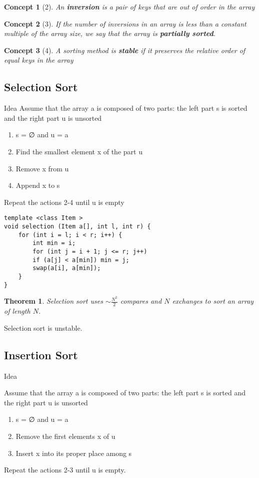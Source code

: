 \documentclass{article}
\newtheorem*{theorem}{Theorem}
\newtheorem*{concept}{Concept}
\begin{document}
\begin{concept}[2]
    An \textbf{inversion} is a pair of keys that are out of order in the array
\end{concept}

\begin{concept}[3]
    If the number of inversions in an array is less than a constant multiple of the array size, we say that the array is \textbf{partially sorted}.
\end{concept}
\begin{concept}[4]
    A sorting method is \textbf{stable} if it preserves the relative order of equal keys in the array
\end{concept}

\subsection{Selection Sort}

Idea
Assume that the array a is composed of two parts: the left part s is sorted and
the right part u is unsorted
\begin{enumerate}
    \item s = ∅ and u = a
    \item Find the smallest element x of the part u
    \item Remove x from u
    \item Append x to s
\end{enumerate}
Repeat the actions 2-4 until u is empty

\begin{verbatim}
template <class Item >
void selection (Item a[], int l, int r) {
    for (int i = l; i < r; i++) {
        int min = i;
        for (int j = i + 1; j <= r; j++)
        if (a[j] < a[min]) min = j;
        swap(a[i], a[min]);
    }
}
\end{verbatim}

\begin{theorem}
 Selection sort uses $\sim \frac{N^2}{2}$ compares and $N$ exchanges to sort an array of length $N$.
\end{theorem}
Selection sort is unstable.

\subsection{Insertion Sort}
Idea

Assume that the array a is composed of two parts: the left part s is sorted and the right part u is unsorted 
\begin{enumerate}
    \item  s = ∅ and u = a
    \item Remove the first elements x of u
    \item Insert x into its proper place among s
\end{enumerate}
Repeat the actions 2-3 until u is empty.
\end{document}
